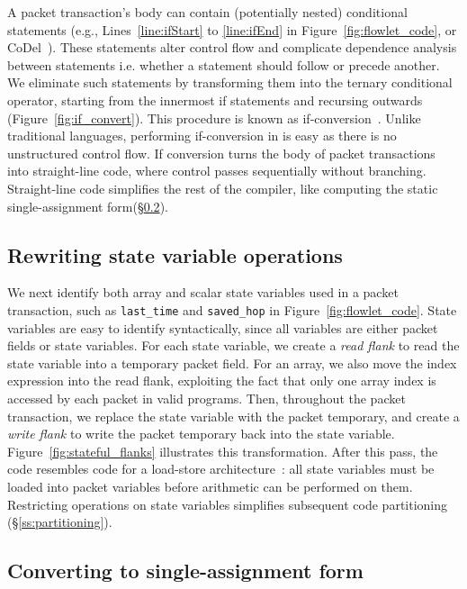 A packet transaction's body can contain (potentially nested) conditional
statements (e.g., Lines~\ref{line:ifStart} to \ref{line:ifEnd} in
Figure~\ref{fig:flowlet_code}, or CoDel~\cite{codel_code}). These statements
alter control flow and complicate dependence analysis between statements i.e.
whether a statement should follow or precede another.  We eliminate such
statements by transforming them into the ternary conditional operator, starting
from the innermost if statements and recursing outwards
(Figure~\ref{fig:if_convert}). This procedure is known as
if-conversion~\cite{if_conversion}. Unlike traditional languages, performing
if-conversion in \pktlanguage is easy as there is no unstructured control
flow.  If conversion turns the body of packet transactions into
straight-line code, where control passes sequentially without branching.
Straight-line code simplifies the rest of the compiler, like computing the
static single-assignment form(\S\ref{ss:ssa}).

\subsection{Rewriting state variable operations} %
\label{ss:load/store}

We next identify both array and scalar state variables used in a packet
transaction, such as \texttt{last\_time} and \texttt{saved\_hop} in
Figure~\ref{fig:flowlet_code}. State variables are easy to identify
syntactically, since all variables are either packet fields or state variables.
For each state variable, we create a \textit{read flank} to read the state
variable into a temporary packet field. For an array, we also move the index
expression into the read flank, exploiting the fact that only one array index
is accessed by each packet in valid \pktlanguage programs.  Then, throughout
the packet transaction, we replace the state variable with the packet
temporary, and create a \textit{write flank} to write the packet temporary back
into the state variable.  Figure~\ref{fig:stateful_flanks} illustrates this
transformation.  After this pass, the code resembles code for a load-store
architecture~\cite{load_store}: all state variables must be loaded into packet
variables before arithmetic can be performed on them.  Restricting operations on state
variables simplifies subsequent code partitioning (\S\ref{ss:partitioning}).

\subsection{Converting to single-assignment form}
\label{ss:ssa}

